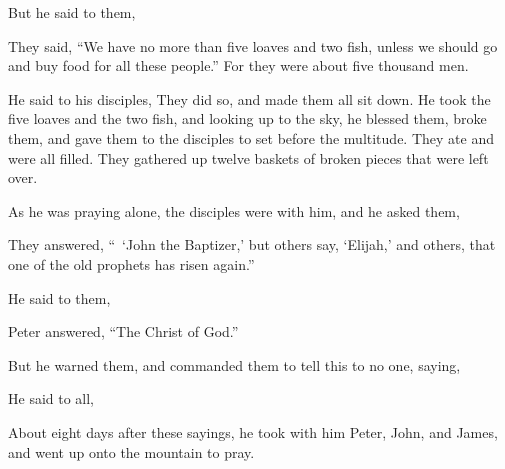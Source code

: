 {\par }{\PP {}But he said to them,
{}
\par }{\PP They said, “We have no more than five loaves and two fish, unless we should go and buy food for all these people.”
For they were about five thousand men.
\par }{\PP He said to his disciples,
{}
They did so, and made them all sit down.
He took the five loaves and the two fish, and looking up to the sky, he blessed them, broke them, and gave them to the disciples to set before the multitude.
They ate and were all filled. They gathered up twelve baskets of broken pieces that were left over.
\par }{\PP {}As he was praying alone, the disciples were with him, and he asked them,
{}
\par }{\PP {}They answered, “ ‘John the Baptizer,’ but others say, ‘Elijah,’ and others, that one of the old prophets has risen again.”
\par }{\PP {}He said to them,
{}
\par }{\PP Peter answered, “The Christ of God.”
\par }{\PP {}But he warned them, and commanded them to tell this to no one,
saying,
{}
\par }{\PP {}He said to all,
{}
{}
\par }{\PP {}About eight days after these sayings, he took with him Peter, John, and James, and went up onto the mountain to pray.
}
